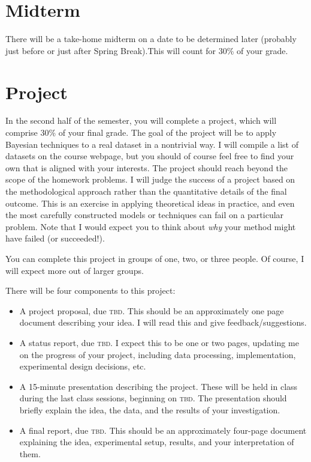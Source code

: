 \documentclass{article}
\newcommand{\acro}[1]{\textsc{\MakeLowercase{#1}}}
\begin{document}
\section*{Midterm}

There will be a take-home midterm on a date to be determined later (probably
just before or just after Spring Break).This will count for 30\% of your grade.

\section*{Project}

In the second half of the semester, you will complete a project, which will
comprise 30\% of your final grade. The goal of the project will be to apply
Bayesian techniques to a real dataset in a nontrivial way.  I will compile a
list of datasets on the course webpage, but you should of course feel free to
find your own that is aligned with your interests.  The project should reach
beyond the scope of the homework problems.  I will judge the success of a
project based on the methodological approach rather than the quantitative
details of the final outcome.  This is an exercise in applying theoretical ideas
in practice, and even the most carefully constructed models or techniques can
fail on a particular problem.  Note that I would expect you to think about
\emph{why} your method might have failed (or succeeded!).

You can complete this project in groups of one, two, or three people.  Of
course, I will expect more out of larger groups.

There will be four components to this project:
\begin{itemize}
\item A project proposal, due \acro{TBD}.  This should be an approximately one
  page document describing your idea.  I will read this and give
  feedback/suggestions.
\item A status report, due \acro{TBD}.  I expect this to be one or two pages,
  updating me on the progress of your project, including data processing,
  implementation, experimental design decisions, etc.
\item A 15-minute presentation describing the project.  These will be held in
  class during the last class sessions, beginning on \acro{TBD}.  The
  presentation should briefly explain the idea, the data, and the results of
  your investigation.
\item A final report, due \acro{TBD}. This should be an approximately four-page
  document explaining the idea, experimental setup, results, and your
  interpretation of them.
\end{itemize}
\end{document}

